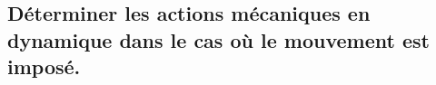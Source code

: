 \subsection{Déterminer les actions mécaniques en dynamique dans le cas où le mouvement est imposé.}
\renewcommand{\repExo}{../../ExercicesCompetences/C2_MettreEnOeuvreDemarche/C2_08_TorseurDynamique}

\renewcommand{\td}{01_T}
\graphicspath{{\repStyle/png/}{\repExo/\td/images/}}


\renewcommand{\td}{02_R}
\graphicspath{{\repStyle/png/}{\repExo/\td/images/}}


\renewcommand{\td}{03_TT}
\graphicspath{{\repStyle/png/}{\repExo/\td/images/}}


\renewcommand{\td}{04_RR}
\graphicspath{{\repStyle/png/}{\repExo/\td/images/}}


\renewcommand{\td}{05_RT}
\graphicspath{{\repStyle/png/}{\repExo/\td/images/}}


\renewcommand{\td}{06_TR}
\graphicspath{{\repStyle/png/}{\repExo/\td/images/}}


\renewcommand{\td}{07_RR3D}
\graphicspath{{\repStyle/png/}{\repExo/\td/images/}}


\renewcommand{\td}{08_RR3D}
\graphicspath{{\repStyle/png/}{\repExo/\td/images/}}


\renewcommand{\td}{09_RT_RSG}
\graphicspath{{\repStyle/png/}{\repExo/\td/images/}}


%
%
%
%
%
%
%
%
%
%
%
%
%
%
%
%
%
